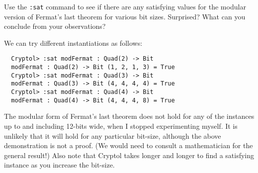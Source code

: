 \begin{Exercise}\label{ex:sat:1}
  Use the {\tt :sat} command to see if there are any satisfying values
  for the modular version of Fermat's last theorem for various bit
  sizes.  Surprised? What can you conclude from your observations?
\end{Exercise}
\begin{Answer}
We can try different instantiations as follows:
\begin{Verbatim}
  Cryptol> :sat modFermat : Quad(2) -> Bit
  modFermat : Quad(2) -> Bit (1, 2, 1, 3) = True
  Cryptol> :sat modFermat : Quad(3) -> Bit
  modFermat : Quad(3) -> Bit (4, 4, 4, 4) = True
  Cryptol> :sat modFermat : Quad(4) -> Bit
  modFermat : Quad(4) -> Bit (4, 4, 4, 8) = True
\end{Verbatim}
The modular form of Fermat's last theorem does not hold for any of the
instances up to and including 12-bits wide, when I stopped
experimenting myself. It is unlikely that it will hold for any
particular bit-size, although the above demonstration is not a proof.
(We would need to consult a mathematician for the general result!)
Also note that Cryptol takes longer and longer to find a satisfying
instance as you increase the bit-size.
\end{Answer}



